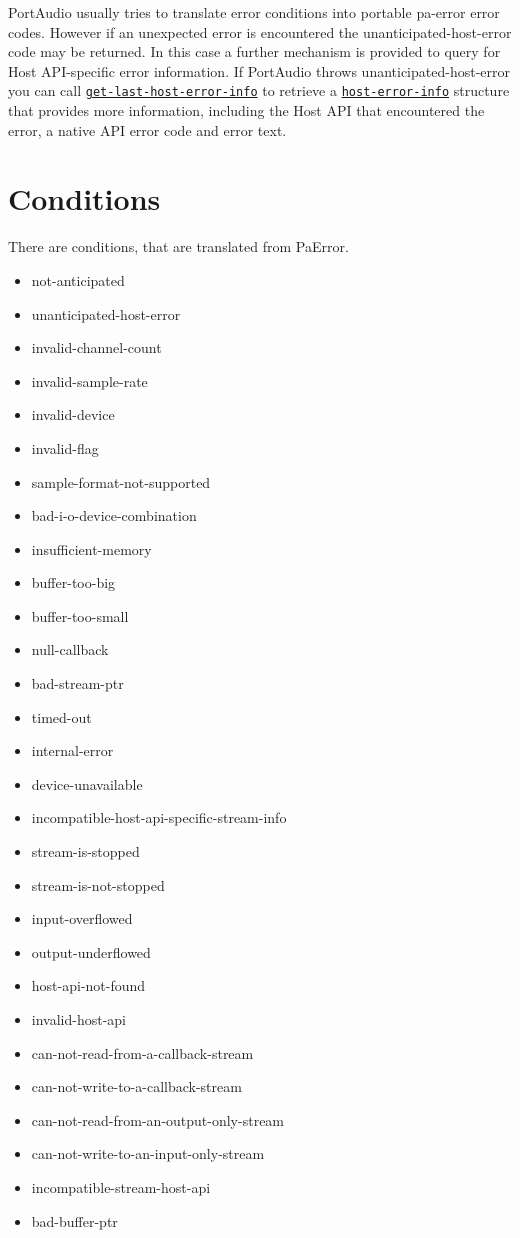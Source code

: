 \documentclass[a4paper]{report}
\begin{document}
PortAudio usually tries to translate error conditions into portable pa-error error codes. However if an unexpected error is encountered the unanticipated-host-error code may be returned. In this case a further mechanism is provided to query for Host API-specific error information. If PortAudio throws unanticipated-host-error you can call \hyperref[portaudio__fun__get-last-host-error-info]{\texttt{get-last-host-error-info}}
   to retrieve a \hyperref[portaudio__class__host-error-info]{\texttt{host-error-info}}
   structure that provides more information, including the Host API that encountered the error, a native API error code and error text.\section{Conditions} \label{d0d0e0e0e0e13}
There are conditions, that are translated from PaError.
    \begin{itemize}
        
    \item not-anticipated  
    \item unanticipated-host-error  
    \item invalid-channel-count  
    \item invalid-sample-rate  
    \item invalid-device  
    \item invalid-flag  
    \item sample-format-not-supported  
    \item bad-i-o-device-combination  
    \item insufficient-memory  
    \item buffer-too-big  
    \item buffer-too-small  
    \item null-callback  
    \item bad-stream-ptr  
    \item timed-out  
    \item internal-error  
    \item device-unavailable  
    \item incompatible-host-api-specific-stream-info  
    \item stream-is-stopped  
    \item stream-is-not-stopped  
    \item input-overflowed  
    \item output-underflowed  
    \item host-api-not-found  
    \item invalid-host-api  
    \item can-not-read-from-a-callback-stream  
    \item can-not-write-to-a-callback-stream  
    \item can-not-read-from-an-output-only-stream  
    \item can-not-write-to-an-input-only-stream  
    \item incompatible-stream-host-api  
    \item bad-buffer-ptr  
    \end{itemize}
\end{document}
